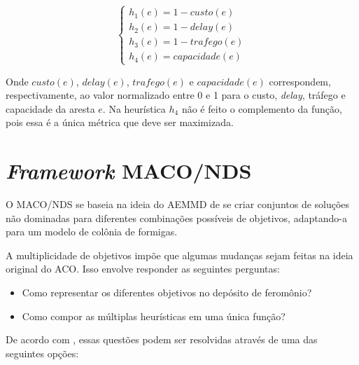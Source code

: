 \[ \begin{cases} 
h_1(e) = 1 - custo(e) \\
h_2(e) = 1 - delay(e) \\
h_3(e) = 1 - trafego(e) \\
h_4(e) = capacidade(e)
\end{cases}
\]

Onde $custo(e)$, $delay(e)$, $trafego(e)$ e $capacidade(e)$ correspondem, respectivamente, ao valor normalizado entre 0 e 1 para o custo, \textit{delay}, tráfego e capacidade da aresta $e$. Na heurística $h_4$ não é feito o complemento da função, pois essa é a única métrica que deve ser maximizada.

\section{\textit{Framework} MACO/NDS}
\label{section_algoritmo_framework}

O MACO/NDS se baseia na ideia do AEMMD de se criar conjuntos de soluções não dominadas para diferentes combinações possíveis de objetivos, adaptando-a para um modelo de colônia de formigas.

A multiplicidade de objetivos impõe que algumas mudanças sejam feitas na ideia original do ACO. Isso envolve responder as seguintes perguntas:

\begin{itemize}
	\item Como representar os diferentes objetivos no depósito de feromônio?
	\item Como compor as múltiplas heurísticas em uma única função?
\end{itemize}

De acordo com \cite{Alaya2007}, essas questões podem ser resolvidas através de uma das seguintes opções:

